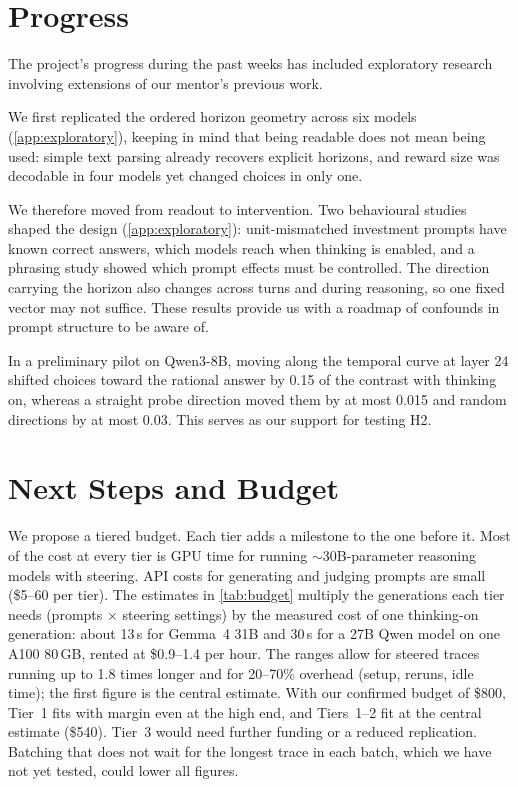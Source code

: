 \documentclass[midterm]{sparreport}
\begin{document}
\section{Progress}

The project's progress during the past weeks has included exploratory research involving extensions of our mentor's previous work.

We first replicated the ordered horizon geometry across six models (\cref{app:exploratory}), keeping in mind that being readable does not mean being used: simple text parsing already recovers explicit horizons, and reward size was decodable in four models yet changed choices in only one.

We therefore moved from readout to intervention. Two behavioural studies shaped the design (\cref{app:exploratory}): unit-mismatched investment prompts have known correct answers, which models reach when thinking is enabled, and a phrasing study showed which prompt effects must be controlled. The direction carrying the horizon also changes across turns and during reasoning, so one fixed vector may not suffice. These results provide us with a roadmap of confounds in prompt structure to be aware of.

In a preliminary pilot on Qwen3-8B, moving along the temporal curve at layer 24 shifted choices toward the rational answer by 0.15 of the contrast with thinking on, whereas a straight probe direction moved them by at most 0.015 and random directions by at most 0.03. This serves as our support for testing H2.

\section{Next Steps and Budget}

We propose a tiered budget. Each tier adds a milestone to the one before it. Most of the cost at every tier is GPU time for running $\sim$30B-parameter reasoning models with steering. API costs for generating and judging prompts are small (\$5--60 per tier). The estimates in \cref{tab:budget} multiply the generations each tier needs (prompts $\times$ steering settings) by the measured cost of one thinking-on generation: about 13\,s for Gemma~4 31B and 30\,s for a 27B Qwen model on one A100 80\,GB, rented at \$0.9--1.4 per hour. The ranges allow for steered traces running up to 1.8 times longer and for 20--70\% overhead (setup, reruns, idle time); the first figure is the central estimate. With our confirmed budget of \$800, Tier~1 fits with margin even at the high end, and Tiers~1--2 fit at the central estimate (\$540). Tier~3 would need further funding or a reduced replication. Batching that does not wait for the longest trace in each batch, which we have not yet tested, could lower all figures.
\end{document}
